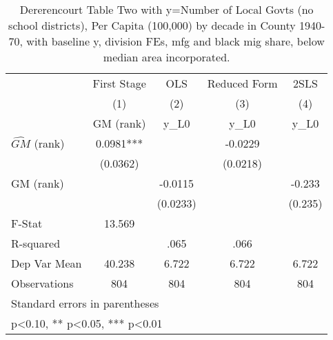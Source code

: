 \begin{table}[htbp]\centering
\def\sym#1{\ifmmode^{#1}\else\(^{#1}\)\fi}
\caption{Dererencourt Table Two with y=Number of Local Govts (no school districts), Per Capita (100,000) by decade in County 1940-70, with baseline y, division FEs, mfg and black mig share, below median area incorporated.}
\begin{tabular}{l*{4}{c}}
\toprule
                    & First Stage   &         OLS   &Reduced Form   &        2SLS   \\
                    &\multicolumn{1}{c}{(1)}&\multicolumn{1}{c}{(2)}&\multicolumn{1}{c}{(3)}&\multicolumn{1}{c}{(4)}\\
                    &\multicolumn{1}{c}{GM  (rank)}&\multicolumn{1}{c}{y\_L0}&\multicolumn{1}{c}{y\_L0}&\multicolumn{1}{c}{y\_L0}\\
\midrule
$\hat{GM}$ (rank)   &      0.0981***&               &     -0.0229   &               \\
                    &    (0.0362)   &               &    (0.0218)   &               \\
\addlinespace
GM  (rank)          &               &     -0.0115   &               &      -0.233   \\
                    &               &    (0.0233)   &               &     (0.235)   \\
\midrule
F-Stat              &      13.569   &               &               &               \\
R-squared           &               &        .065   &        .066   &               \\
Dep Var Mean        &      40.238   &       6.722   &       6.722   &       6.722   \\
Observations        &         804   &         804   &         804   &         804   \\
\bottomrule
\multicolumn{5}{l}{\footnotesize Standard errors in parentheses}\\
\multicolumn{5}{l}{\footnotesize * p<0.10, ** p<0.05, *** p<0.01}\\
\end{tabular}
\end{table}
